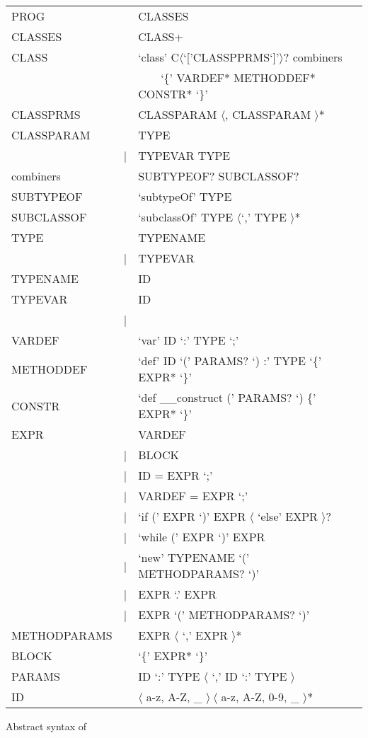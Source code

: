 \begin{listing}
	\begin{tabular}[H]{lrll}
		PROG & \lra & CLASSES \\
		CLASSES & \lra & CLASS+ \\
		CLASS & \lra & `class' C$\langle$`['CLASSPPRMS`]'$\rangle$? combiners \\
		& & ~~~~`\{' VARDEF* METHODDEF* CONSTR* `\}' \\
		CLASSPRMS & \lra & CLASSPARAM $\langle$, CLASSPARAM $\rangle$* \\
		CLASSPARAM & \lra & TYPE \\
		 & | & TYPEVAR \match TYPE \\
		combiners & \lra & SUBTYPEOF? SUBCLASSOF? \\
		SUBTYPEOF & \lra & `subtypeOf' TYPE \\
		SUBCLASSOF & \lra & `subclassOf' TYPE $\langle$`,' TYPE $\rangle$* \\
		TYPE & \lra & TYPENAME \\
		& | & TYPEVAR \\
		TYPENAME & \lra & ID \\
		TYPEVAR & \lra & ID \\
		& | & \mytype \\
		VARDEF & \lra & `var' ID `:' TYPE `;' \\
		METHODDEF & \lra & `def' ID `(' PARAMS? `) :' TYPE `\{' EXPR* `\}'  \\
		CONSTR & \lra & `def \_\_construct (' PARAMS? `) \{' EXPR* `\}' \\
		EXPR & \lra & VARDEF \\
		& | & BLOCK \\
		& | & ID = EXPR `;' \\
		& | & VARDEF = EXPR `;' \\
		& | & `if (' EXPR `)' EXPR $\langle$ `else' EXPR $\rangle$?  \\
		& | & `while (' EXPR `)' EXPR \\
		& | & `new' TYPENAME `(' METHODPARAMS? `)' \\
		& | & EXPR `.' EXPR \\
		& | & EXPR `(' METHODPARAMS? `)' \\
		METHODPARAMS & \lra & EXPR $\langle$ `,' EXPR $\rangle$* \\
		BLOCK & \lra & `\{' EXPR* `\}' \\
		PARAMS & \lra & ID `:' TYPE $\langle$ `,' ID `:' TYPE $\rangle$ \\
		ID & \lra & $\langle$ a-z, A-Z, \_ $\rangle~\langle$ a-z, A-Z, 0-9, \_ $\rangle$*
	\end{tabular}
	\caption{Abstract syntax of \ooplss}
	\label{lst:abstractSyntax}
\end{listing}

